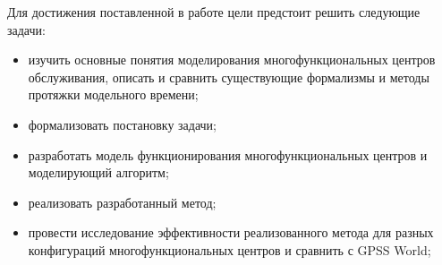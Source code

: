 Для достижения поставленной в работе цели предстоит решить следующие задачи:
\begin{itemize}[label=---]
	\item изучить основные понятия моделирования многофункциональных центров обслуживания, описать и сравнить существующие формализмы и методы протяжки модельного времени;
	\item формализовать постановку задачи;
	\item разработать модель функционирования многофункциональных центров и моделирующий алгоритм;
	\item реализовать разработанный метод; 
	\item провести исследование эффективности реализованного метода для разных конфигураций многофункциональных центров и сравнить с GPSS World;
\end{itemize}

